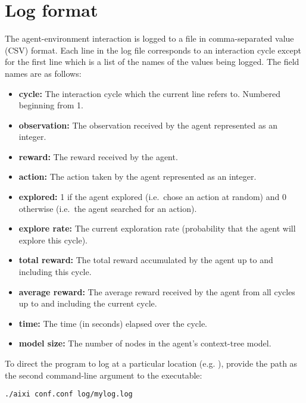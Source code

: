 \documentclass[a4paper,11pt]{article}
\begin{document}
\section{Log format}
The agent-environment interaction is logged to a file in comma-separated value (CSV) format. Each line in the log file corresponds to an interaction cycle except for the first line which is a list of the names of the values being logged. The field names are as follows:
\begin{itemize}
\item {\bf cycle:} The interaction cycle which the current line refers to. Numbered beginning from 1.

\item {\bf observation:} The observation received by the agent represented as an integer.

\item {\bf reward:} The reward received by the agent.

\item {\bf action:} The action taken by the agent represented as an integer.

\item {\bf explored:} 1 if the agent explored (i.e.~chose an action at random) and 0 otherwise (i.e.~the agent searched for an action).

\item {\bf explore rate:} The current exploration rate (probability that the agent will explore this cycle).

\item {\bf total reward:} The total reward accumulated by the agent up to and including this cycle.

\item {\bf average reward:} The average reward received by the agent from all cycles up to and including the current cycle.

\item {\bf time:} The time (in seconds) elapsed over the cycle.

\item {\bf model size:} The number of nodes in the agent's context-tree model.
\end{itemize}
To direct the program to log at a particular location (e.g. ), provide the path as the second command-line argument to the executable:
\begin{lstlisting}[frame=single]
./aixi conf.conf log/mylog.log
\end{lstlisting}
\end{document}
